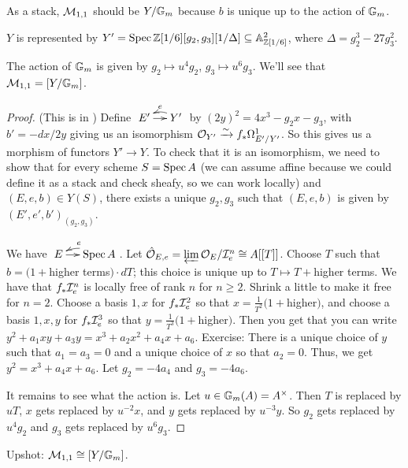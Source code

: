  As a stack, $\mathcal{M}_{1,1}$ should be $Y/\mathbb{G}_m$ because $b$ is unique up
to the action of
 $\mathbb{G}_m$.
 \begin{proposition}
   $Y$ is represented by $Y'=\operatorname{Spec}
\mathbb{Z}[1/6][g_2,g_3][1/\Delta]\subseteq
   \mathbb{A}^2_{\mathbb{Z}[1/6]}$, where $\Delta=g_2^3-27g_3^2$.
 \end{proposition}
 The action of $\mathbb{G}_m$ is given by $g_2\mapsto u^4g_2$, $g_3\mapsto
u^6g_3$. We'll see
 that $\mathcal{M}_{1,1}=[Y/\mathbb{G}_m]$.
 \begin{proof}
   (This is in \cite{Hartshorne}) Define $\xymatrix@-1pc{E'\ar[r] &
Y'\ar@/_/[l]_e}$ by
   $(2y)^2=4x^3-g_2x-g_3$, with $b'=-dx/2y$ giving us an isomorphism
   $\mathcal{O}_{Y'}\xrightarrow\sim f_*\Omega^1_{E'/Y'}$. So this gives us a
morphism of functors
   $Y'\to Y$. To check that it is an isomorphism, we need to show
that for every scheme
   $S=\operatorname{Spec} A$ (we can assume affine because we could define it as a
stack and check
   sheafy, so we can work locally) and $(E,e,b)\in Y(S)$, there
exists a unique $g_2,g_3$
   such that $(E,e,b)$ is given by $(E',e',b')_{(g_2,g_3)}$.

   We have $\xymatrix@-1pc{E\ar[r] & \spec A\ar@/_/[l]_e}$. Let $\hat
   {\mathcal{O}}_{E,e}=\varprojlim \mathcal{O}_E/\mathcal{I}_e^n\cong A[[T]]$. Choose $T$ such
that $b=(1+$higher
   terms$)\cdot dT$; this choice is unique up to $T\mapsto T+$higher
terms. We have that
   $f_*\mathcal{I}_e^n$ is locally free of rank $n$ for $n\ge 2$. Shrink a
little to make it free
   for $n=2$. Choose a basis $1,x$ for $f_*\mathcal{I}_e^2$ so that
$x=\frac{1}{T^2}(1+$higher$)$,
   and choose a basis $1,x,y$ for $f_*\mathcal{I}_e^3$ so that
$y=\frac{1}{T^3}(1+$higher$)$. Then
   you get that you can write $y^2+a_1xy+a_3y=x^3+a_2x^2+a_4x+a_6$.
Exercise: There is a
   unique choice of $y$ such that $a_1=a_3=0$ and a unique choice of
$x$ so that $a_2=0$.
   Thus, we get $y^2=x^3+a_4x+a_6$. Let $g_2=-4a_4$ and $g_3=-4a_6$.

   It remains to see what the action is. Let $u\in
\mathbb{G}_m(A)=A^\times$. Then $T$ is
   replaced by $uT$, $x$ gets replaced by $u^{-2}x$, and $y$ gets
replaced by $u^{-3}y$.
   So $g_2$ gets replaced by $u^4g_2$ and $g_3$ gets replaced by
$u^6g_3$.
 \end{proof}
 Upshot: $\mathcal{M}_{1,1}\cong [Y/\mathbb{G}_m]$.
